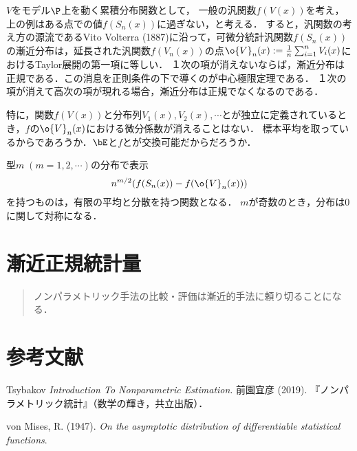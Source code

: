 \documentclass[uplatex,dvipdfmx]{jsreport}
\begin{document}
\begin{discussion}[動機]
    $V$をモデル$\P$上を動く累積分布関数として，
    一般の汎関数$f(V(x))$を考え，上の例はある点での値$f(S_n(x))$に過ぎない，と考える．
    すると，汎関数の考え方の源流であるVito Volterra (1887)に沿って，可微分統計汎関数$f(S_n(x))$の漸近分布は，延長された汎関数$f(V_n(x))$の点$\o{V}_n(x):=\frac{1}{n}\sum_{i=1}^nV_i(x)$におけるTaylor展開の第一項に等しい．
    １次の項が消えないならば，漸近分布は正規である．この消息を正則条件の下で導くのが中心極限定理である．
    １次の項が消えて高次の項が現れる場合，漸近分布は正規でなくなるのである．

    特に，関数$f(V(x))$と分布列$V_1(x),V_2(x),\cdots$とが独立に定義されているとき，$f$の$\o{V}_n(x)$における微分係数が消えることはない．
    標本平均を取っているからであろうか．$\bE$と$f$とが交換可能だからだろうか．
\end{discussion}

\begin{discussion}
    型$m\;(m=1,2,\cdots)$の分布で表示
    \[n^{m/2}(f(S_n(x))-f(\o{V}_n(x)))\]
    を持つものは，有限の平均と分散を持つ関数となる．
    $m$が奇数のとき，分布は$0$に関して対称になる．
\end{discussion}

\chapter{漸近正規統計量}

\begin{quotation}
    ノンパラメトリック手法の比較・評価は漸近的手法に頼り切ることになる．
\end{quotation}

\chapter{参考文献}

\begin{thebibliography}{99}
    Tsybakov \textit{Introduction To Nonparametric Estimation}.
    前園宜彦 (2019). 『ノンパラメトリック統計』（数学の輝き，共立出版）．

    von Mises, R. (1947). \textit{On the asymptotic distribution of differentiable statistical functions}.
\end{thebibliography}
\end{document}
